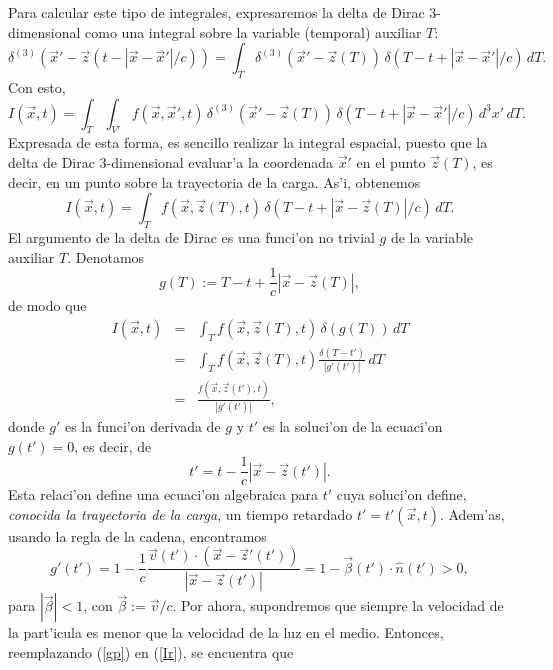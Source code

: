 Para calcular este tipo de integrales, expresaremos la delta de Dirac 3-dimensional como una integral sobre la variable (temporal) auxiliar $T$:
\begin{equation}
 \delta^{(3)}(\vec{x}'-\vec{z}(t-|\vec{x}-\vec{x}'|/c))=\int_T \delta^{(3)}(\vec{x}'-\vec{z}(T))\,\delta(T-t+|\vec{x}-\vec{x}'|/c)\, dT.
\end{equation}
Con esto,
\begin{equation}
I(\vec{x},t)=\int_{T}\int_{V'}
f(\vec{x},\vec{x}',t)\,\delta^{(3)}(\vec{x}'-\vec{z}(T))\,\delta(T-t+|\vec{x}-\vec{x}'|/c)\,d^3x' \, dT. \label{potretqgm11}
\end{equation}
Expresada de esta forma, es sencillo realizar la integral espacial, puesto que la delta de Dirac 3-dimensional evaluar'a la coordenada $\vec{x}'$ en el punto $\vec{z}(T)$, es decir, en un punto sobre la trayectoria de la carga. As'i, obtenemos
\begin{equation}
I(\vec{x},t)=\int_{T}f(\vec{x},\vec{z}(T),t)\,\delta(T-t+|\vec{x}-\vec{z}(T)|/c)\, dT. \label{potretqgm12}
\end{equation}
El argumento de la delta de Dirac es una funci'on no trivial $g$ de la variable auxiliar $T$. Denotamos
\begin{equation}
 g(T):=T-t+\frac{1}{c}|\vec{x}-\vec{z}(T)|,
\end{equation}
de modo que
\begin{eqnarray}
I(\vec{x},t)&=&\int_{T}f(\vec{x},\vec{z}(T),t)\,\delta(g(T))\, dT \\
&=&\int_{T}f(\vec{x},\vec{z}(T),t)\frac{\delta(T-t')}{|g'(t')|}\, dT \\
&=&\frac{f(\vec{x},\vec{z}(t'),t)}{|g'(t')|}, \label{Ir}
\end{eqnarray}
donde $g'$ es la funci'on derivada de $g$ y $t'$ es la soluci'on de la ecuaci'on $g(t')=0$, es decir, de
\begin{equation}
 t'=t-\frac{1}{c}|\vec{x}-\vec{z}(t')|. \label{t'}
\end{equation}
Esta relaci'on define una ecuaci'on algebraica para $t'$ cuya soluci'on define, \textit{conocida la trayectoria de la carga}, un tiempo retardado $t'=t'(\vec{x},t)$. Adem'as, usando la regla de la cadena, encontramos
\begin{equation}
 g'(t')=1-\frac{1}{c}\frac{\vec{v}(t')\cdot\left(\vec{x}-\vec{z}'(t')\right)}{\left|\vec{x}-\vec{z}(t')\right|}=1-\vec{\beta}(t')\cdot\hat{n}(t')>0 \label{gp},
\end{equation}
para $|\vec\beta|<1$, con $\vec\beta:=\vec{v}/c$. Por ahora, supondremos que siempre la velocidad de la part'icula es menor que la velocidad de la luz en el medio. Entonces, reemplazando (\ref{gp}) en (\ref{Ir}), se encuentra que
